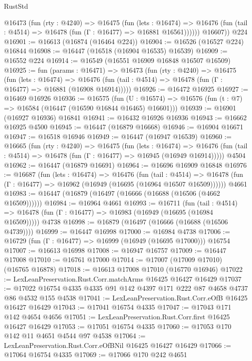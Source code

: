 \begin{lexlean}{RustStd}
\begin{coremodule}
          @16473
            (fun (rty : @4240) =>
            @16475
              (fun (lets : @16474) =>
              @16476 (fun (tail : @4514) => @16478 (fun (Γ : @16477) => @16881 @16561))))))
        @16607))
    @224
@16901 := @16613 (@16874 (@16464 @224))
@16904 := @16526 (@16527 @224) @16844
@16908 := @16447 (@16518 (@16904 @16535) @16539)
@16909 := @16552 @224
@16914 := @16549 (@16551 @16909 @16848 @16507 @16509)
@16925 := fun (params : @16471) =>
  @16473
    (fun (rty : @4240) =>
    @16475
      (fun (lets : @16474) =>
      @16476 (fun (tail : @4514) => @16478 (fun (Γ : @16477) => @16881 (@16908 @16914)))))
@16926 := @16472 @16925
@16927 := @16469 @16926
@16936 := @16575
    (fun (U : @16574) => @16576 (fun (t : @7) => @16584 (@16447 (@16590 @16844 @16465) @16601)))
@16939 := @16901 (@16927 @16936) @16841
@16941 := @16432 @16926 @16936
@16943 := @16662 @16925 @4500
@16945 := @16447 (@16879 @16668)
@16946 := @16904 @16671
@16947 := @16518 @16946
@16949 := @16447 (@16947 @16539)
@16960 := @16665
    (fun (rty : @4240) =>
    @16475
      (fun (lets : @16474) =>
      @16476 (fun (tail : @4514) => @16478 (fun (Γ : @16477) => @16945 (@16949 @16914)))))
    @4504
@16962 := @16447 (@16879 @16691)
@16964 := @16696 @16909 @16848
@16976 := @16687
    (fun (lets : @16474) =>
    @16476
      (fun (tail : @4514) =>
      @16478 (fun (Γ : @16477) => @16962 (@16949 (@16695 (@16964 @16507 @16509))))))
    @4661
@16983 := @16447 (@16879 (@16497 (@16666 (@16688 (@16506 (@4662 @16509))))))
@16984 := @16964 @4661
@16993 := @16711
    (fun (tail : @4514) => @16478 (fun (Γ : @16477) => @16983 (@16949 (@16695 (@16984 @16509)))))
    @4738
@16998 := @16879 (@16497 (@16666 (@16688 (@16506 @4739))))
@16999 := @16447 @16998
@17000 := @16984 @4738
@17006 := @16729 (fun (Γ : @16477) => @16999 (@16949 (@16695 @17000))) @16754
@17007 := @16613 @16998
@17008 := @16947 @16757
@17009 := @16447 @17008
@17010 := @16761 @17000
@17014 := @17007 (@17009 @17010) (@16765 @16878)
@17018 := @16613 @17008 @17010 (@16770 @16946)
@17022 := LexLeanPreservation.Rust.Corr.matchArms @16425 @16427 @16429
@17037 := @17022 @16754 @4335 @4335 @91 @142 @4397 @171 @222 @87 @4658 @4737 @86 @4532 @155 @4538
@17041 := LexLeanPreservation.Rust.Corr.eOfB @16425 @16427 @16429
@17043 := @17041 @16754 @4335
@17047 := @17043 @171 @142 @4654 @4656
@17051 := LexLeanPreservation.Rust.Corr.first @16425 @16427 @16429
@17053 := @17051 @16754 @4335
@17060 := @17053 @170 @142 @11 @4651 @4544 @97 @4538
@17064 := LexLeanPreservation.Rust.Corr.eOfBNil @16425 @16427 @16429
@17066 := @17064 @16754 @4335
@17069 := @17066 @170 @242 @4651

\end{coremodule}
\end{lexlean}
